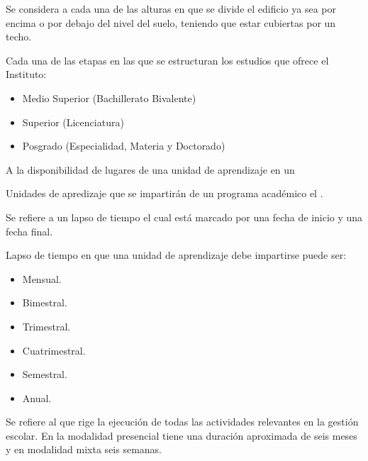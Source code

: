 \begin{bGlosario}
	 Se considera a cada una de las alturas en que se divide el edificio ya sea por encima o por debajo del nivel del suelo, teniendo que estar cubiertas por un techo.
	
	 Cada una de las etapas en las que se estructuran los estudios que ofrece el Instituto:
	\begin{itemize}
	\item Medio Superior (Bachillerato Bivalente)
	\item Superior (Licenciatura)
	\item Posgrado (Especialidad, Materia y Doctorado)
	\end{itemize}
		A la disponibilidad de lugares de una unidad de aprendizaje en un 

	 Unidades de apredizaje que se impartirán de un programa académico el .

	 Se refiere a un lapso de tiempo el cual está marcado por una fecha de inicio y una fecha final. 	
	
	 Lapso de tiempo en que una unidad de aprendizaje debe impartirse puede ser:
	\begin{itemize}
		\item Mensual.
		\item Bimestral.
		\item Trimestral.
		\item Cuatrimestral.
		\item Semestral.
		\item Anual.
	\end{itemize}

 	 Se refiere al  que rige la ejecución de todas las actividades relevantes en la gestión escolar. En la modalidad presencial tiene una duración aproximada de seis meses y en modalidad mixta seis semanas.
 	

\end{bGlosario}
